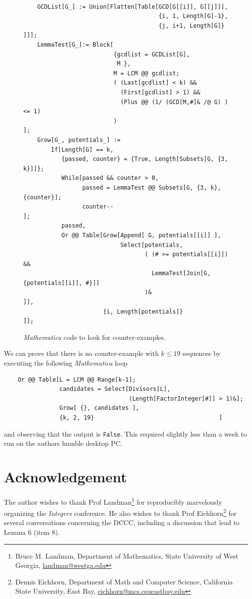 \documentclass[12pt]{article}
\begin{document}
\begin{figure}[b]
    {\tt
    \begin{verbatim}
    GCDList[G_] := Union[Flatten[Table[GCD[G[[i]], G[[j]]],
                                       {i, 1, Length[G]-1},
                                       {j, i+1, Length[G]}    ]]];
    LemmaTest[G_]:= Block[
                          {gcdlist = GCDList[G],
                           M },
                          M = LCM @@ gcdlist;
                          ( (Last[gcdlist] < k) &&
                            (First[gcdlist] > 1) &&
                            (Plus @@ (1/ (GCD[M,#]& /@ G) ) <= 1)
                          )                                   ];
    Grow[G_, potentials_] :=
        If[Length[G] == k,
           {passed, counter} = {True, Length[Subsets[G, {3, k}]]};
           While[passed && counter > 0,
                 passed = LemmaTest @@ Subsets[G, {3, k}, {counter}];
                 counter--                                    ];
           passed,
           Or @@ Table[Grow[Append[ G, potentials[[i]] ],
                            Select[potentials,
                                   ( (# >= potentials[[i]]) &&
                                     LemmaTest[Join[G, {potentials[[i]], #}]]
                                   )&                         ]],
                       {i, Length[potentials]}                ]];
    \end{verbatim}
    }
    \caption{{\em Mathematica} code to look for counter-examples.\label{code}}
\end{figure}

We can prove that there is no counter-example with $k\leq 19$ sequences by executing the following {\em
Mathematica} loop
    {\tt \begin{verbatim}
    Or @@ Table[L = LCM @@ Range[k-1];
                candidates = Select[Divisors[L],
                                    (Length[FactorInteger[#]] > 1)&];
                Grow[ {}, candidates ],
                {k, 2, 19}                                    ]
    \end{verbatim}}
\noindent and observing that the output is {\tt False}. This required slightly less than a week to run on the
authors humble desktop PC.

\vskip 30pt
\section*{\normalsize Acknowledgement} The author wishes to thank Prof Landman\footnote{Bruce M. Landman,
Department of Mathematics, State University of West Georgia, \url{landman@westga.edu}} for reproducibly
marvelously organizing the {\em Integers} conference. He also wishes to thank Prof Eichhorn\footnote{Dennis
Eichhorn, Department of Math and Computer Science, California State University, East Bay,
\url{eichhorn@mcs.csueastbay.edu}} for several conversations concerning the DCCC, including a discussion that
lead to Lemma 6 (item 8).
\end{document}
